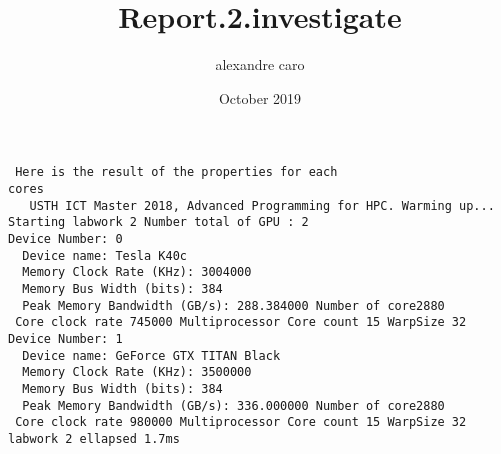 \documentclass{article} \usepackage[utf8]{inputenc} \title{Report.2.investigate} \author{alexandre caro }
\date{October 2019}
\begin{document}
 \maketitle \begin{verbatim} Here is the result of the properties for each 
cores
   USTH ICT Master 2018, Advanced Programming for HPC. Warming up... Starting labwork 2 Number total of GPU : 2 
Device Number: 0
  Device name: Tesla K40c
  Memory Clock Rate (KHz): 3004000
  Memory Bus Width (bits): 384
  Peak Memory Bandwidth (GB/s): 288.384000 Number of core2880
 Core clock rate 745000 Multiprocessor Core count 15 WarpSize 32 Device Number: 1
  Device name: GeForce GTX TITAN Black
  Memory Clock Rate (KHz): 3500000
  Memory Bus Width (bits): 384
  Peak Memory Bandwidth (GB/s): 336.000000 Number of core2880
 Core clock rate 980000 Multiprocessor Core count 15 WarpSize 32 labwork 2 ellapsed 1.7ms \end{verbatim} 
\end{document}
